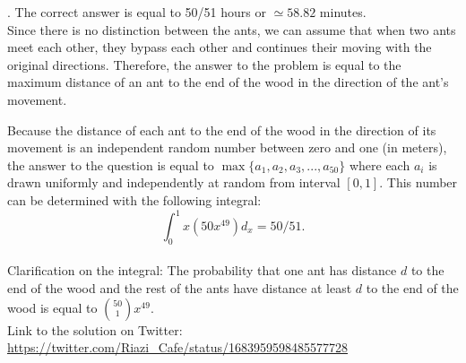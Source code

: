 \begin{solution}.
The correct answer is equal to 50/51 hours or $\simeq 58.82$ minutes.\\[0.2cm]

Since  there is no distinction between the ants, we can assume that when two ants meet each other, they bypass each other and continues their moving with the original directions. Therefore, the answer to the problem is equal to the maximum distance of an ant to the end of the wood in the direction of the ant's movement.

Because the distance of each ant to the end of the wood in the direction of its movement is an independent random number between zero and one (in meters), the answer to the question is equal to $\max\{a_1, a_2, a_3, ..., a_{50}\}$ where each $a_i$ is drawn uniformly and independently at random from interval $[0,1]$. This number can be determined with the following integral:
$$\int_0^1 x(50x^{49}) d_x = 50/51.$$\\

Clarification on the integral: The probability that one ant has distance $d$ to the end of the wood and the rest of the ants have distance at least $d$ to the end of the wood is equal to $\binom{50}{1} x^{49}$.\\[0.2cm]

Link to the solution on Twitter:  \url{https://twitter.com/Riazi_Cafe/status/1683959598485577728}\end{solution}